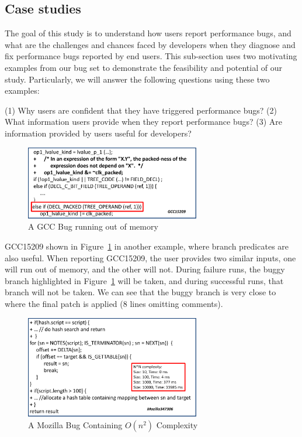 \subsection{Case studies}

The goal of this study is to understand how users report performance bugs, 
and what are the challenges and chances faced by developers 
when they diagnose and fix performance bugs reported by end users. 
This sub-section uses two motivating examples from our bug set
to demonstrate the feasibility and potential of our study. 
Particularly, we will answer the following questions using these two examples:

(1) Why users are confident that they have triggered performance bugs?
(2) What information users provide when they report performance bugs?
(3) Are information provided by users useful for developers? 

\begin{figure}[t!]
\begin{center}
\includegraphics[width=3in]{figures/gcc15209}
\caption{A GCC Bug running out of memory}
\label{fig:GCC15209}
\end{center}
\end{figure}

GCC15209 shown in Figure~\ref{fig:GCC15209} in another example, where branch predicates are also useful. 
When reporting GCC15209, the user provides two similar inputs, one will run out of memory, and the other will not. During failure runs, the buggy branch highlighted in Figure~\ref{fig:GCC15209} will be taken, 
and during successful runs, that branch will not be taken. 
We can see that the buggy branch is very close to where the final patch is applied (8 lines omitting comments). 



\begin{figure}[t!]
\begin{center}
\includegraphics[width=3in]{figures/Mozilla347306}
\caption{A Mozilla Bug Containing $O(n^2)$ Complexity}
\label{fig:Mozilla347306}
\end{center}
\end{figure}

